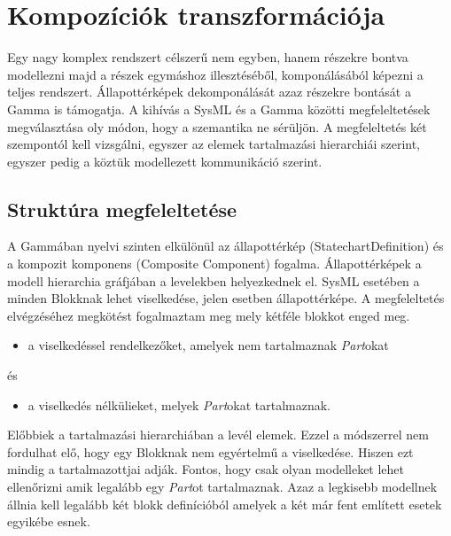 \newpage
\section{Kompozíciók transzformációja}

Egy nagy komplex rendszert célszerű nem egyben, hanem részekre bontva modellezni majd a részek egymáshoz illesztéséből, komponálásából képezni a teljes rendszert. Állapottérképek dekomponálását azaz részekre bontását a Gamma is támogatja. A kihívás a SysML és a Gamma közötti megfeleltetések megválasztása oly módon, hogy a szemantika ne sérüljön. A megfeleltetés két szempontól kell vizsgálni, egyszer az elemek tartalmazási hierarchiái szerint, egyszer pedig a köztük modellezett kommunikáció szerint.

\subsection{Struktúra megfeleltetése}
A Gammában nyelvi szinten elkülönül az állapottérkép (StatechartDefinition) és a kompozit komponens (Composite Component) fogalma. Állapottérképek a modell hierarchia gráfjában a levelekben helyezkednek el. SysML esetében a minden Blokknak lehet viselkedése, jelen esetben állapottérképe. A megfeleltetés elvégzéséhez megkötést fogalmaztam meg mely kétféle blokkot enged meg. 
\begin{itemize}
	\item a viselkedéssel rendelkezőket, amelyek nem tartalmaznak \emph{Part}okat
\end{itemize}
és
\begin{itemize}
	\item a viselkedés nélkülieket, melyek \emph{Part}okat tartalmaznak.
\end{itemize}
Előbbiek a tartalmazási hierarchiában a levél elemek. Ezzel a módszerrel nem fordulhat elő, hogy egy Blokknak nem egyértelmű a viselkedése. Hiszen ezt mindig a tartalmazottjai adják. Fontos, hogy csak olyan modelleket lehet ellenőrizni amik legalább egy \emph{Part}ot tartalmaznak. Azaz a legkisebb modellnek állnia kell legalább két blokk definícióból amelyek a két már fent említett esetek egyikébe esnek.

